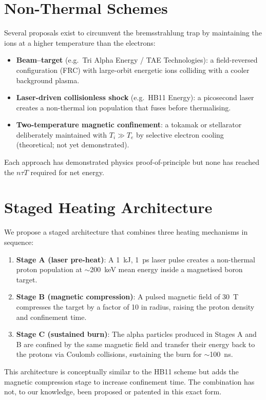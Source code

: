 \documentclass[11pt]{article}
\begin{document}
\section{Non-Thermal Schemes}

Several proposals exist to circumvent the bremsstrahlung trap by
maintaining the ions at a higher temperature than the electrons:
\begin{itemize}
\item \textbf{Beam--target} (e.g.\ Tri Alpha Energy / TAE
Technologies): a field-reversed configuration (FRC) with
large-orbit energetic ions colliding with a cooler background
plasma.
\item \textbf{Laser-driven collisionless shock} (e.g.\ HB11 Energy):
a picosecond laser creates a non-thermal ion population that fuses
before thermalising.
\item \textbf{Two-temperature magnetic confinement}: a tokamak or
stellarator deliberately maintained with $T_i \gg T_e$ by selective
electron cooling (theoretical; not yet demonstrated).
\end{itemize}

Each approach has demonstrated physics proof-of-principle but none
has reached the $n \tau T$ required for net energy.

\section{Staged Heating Architecture}

We propose a staged architecture that combines three heating mechanisms
in sequence:

\begin{enumerate}
\item \textbf{Stage A (laser pre-heat)}: A 1~kJ, 1~ps laser pulse
creates a non-thermal proton population at $\sim$200~keV mean energy
inside a magnetised boron target.
\item \textbf{Stage B (magnetic compression)}: A pulsed magnetic
field of 30~T compresses the target by a factor of 10 in radius,
raising the proton density and confinement time.
\item \textbf{Stage C (sustained burn)}: The alpha particles
produced in Stages A and B are confined by the same magnetic field
and transfer their energy back to the protons via Coulomb collisions,
sustaining the burn for $\sim$100~ns.
\end{enumerate}

This architecture is conceptually similar to the HB11 scheme
\cite{gavrilov2021} but adds the magnetic compression stage to
increase confinement time. The combination has not, to our knowledge,
been proposed or patented in this exact form.
\end{document}
